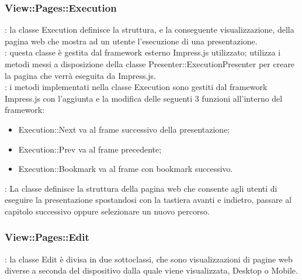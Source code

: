 {{		\subsubsection{View::Pages::Execution}{
			\textbf{\tipo}: la classe Execution definisce la struttura, e la conseguente visualizzazione, della pagina web che mostra ad un utente l'esecuzione di una presentazione.\\
			\textbf{\relaz}: questa classe è gestita dal framework esterno Impress.js utilizzato; utilizza i metodi messi a disposizione della classe Presenter::ExecutionPresenter per creare la pagina che verrà eseguita da Impress.js.\\
			\textbf{\interfacce}: i metodi implementati nella classe Execution sono gestiti dal framework Impress.js con l'aggiunta e la modifica delle seguenti 3 funzioni all'interno del framework:
			\begin{itemize}
				\item Execution::Next va al frame successivo della presentazione;
				\item Execution::Prev va al frame precedente;
				\item Execution::Bookmark va al frame con bookmark successivo.
			\end{itemize}
			\textbf{\attivita}: La classe definisce la struttura della pagina web che consente agli utenti di eseguire la presentazione spostandosi con la tastiera avanti e indietro, passare al capitolo successivo oppure selezionare un nuovo percorso.\\
		}
		\subsubsection{View::Pages::Edit}{
			\textbf{\tipo}: la classe Edit è divisa in due sottoclassi, che sono visualizzazioni di pagine web diverse a seconda del dispositivo dalla quale viene visualizzata, Desktop o Mobile.\\
		}
}}
